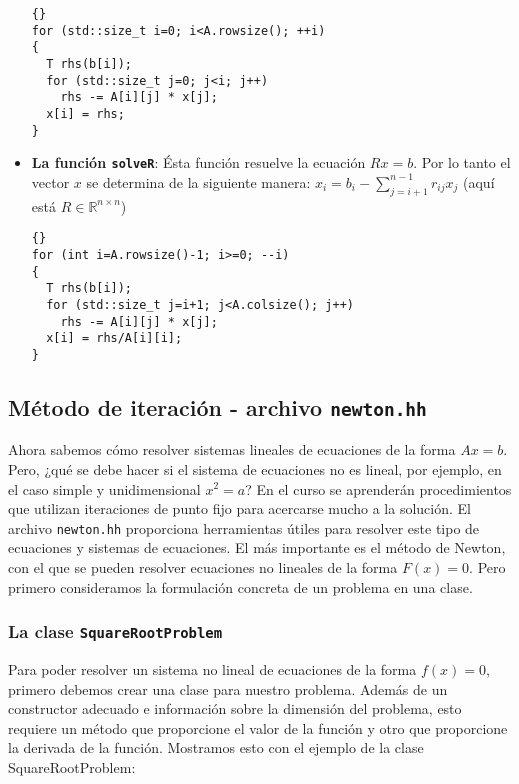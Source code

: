 \begin{itemize}
{\footnotesize{\begin{lstlisting}{}
for (std::size_t i=0; i<A.rowsize(); ++i)
{
  T rhs(b[i]);
  for (std::size_t j=0; j<i; j++)
    rhs -= A[i][j] * x[j];
  x[i] = rhs;
}
\end{lstlisting}}}

\item \textbf{La función \lstinline{solveR}}: 
  Ésta función resuelve la ecuación $Rx=b$. 
  Por lo tanto el vector $x$ se determina de la siguiente manera:
  $x_i= b_i - \sum_{j=i+1}^{n-1}r_{ij}x_j$ (aquí está
  $R \in \mathbb{R}^{n \times n}$)

{\footnotesize{\begin{lstlisting}{}
for (int i=A.rowsize()-1; i>=0; --i)
{
  T rhs(b[i]);
  for (std::size_t j=i+1; j<A.colsize(); j++)
    rhs -= A[i][j] * x[j];
  x[i] = rhs/A[i][i];
}
\end{lstlisting}}}

\end{itemize}



\subsection{Método de iteración - archivo \lstinline{newton.hh}}

  Ahora sabemos cómo resolver sistemas lineales de ecuaciones de la forma $Ax = b$. 
  Pero, ¿qué se debe hacer si el sistema de ecuaciones no es lineal, por ejemplo, 
  en el caso simple y unidimensional $x^2 = a$? En el curso se aprenderán procedimientos 
  que utilizan iteraciones de punto fijo para acercarse mucho a la solución. 
  El archivo \lstinline{newton.hh} proporciona herramientas útiles para resolver este tipo de ecuaciones 
  y sistemas de ecuaciones.  El más importante es el método de Newton, con el que se pueden resolver ecuaciones 
  no lineales de la forma $F (x) = 0$. Pero primero consideramos la formulación concreta 
  de un problema en una clase.

\subsubsection{La clase  \lstinline{SquareRootProblem}}

  Para poder resolver un sistema no lineal de ecuaciones de la forma $f (x) = 0$, 
  primero debemos crear una clase para nuestro problema. Además de un constructor 
  adecuado e información sobre la dimensión del problema, esto requiere un método 
  que proporcione el valor de la función y otro que proporcione la derivada de la función. 
  Mostramos esto con el ejemplo de la clase SquareRootProblem:

